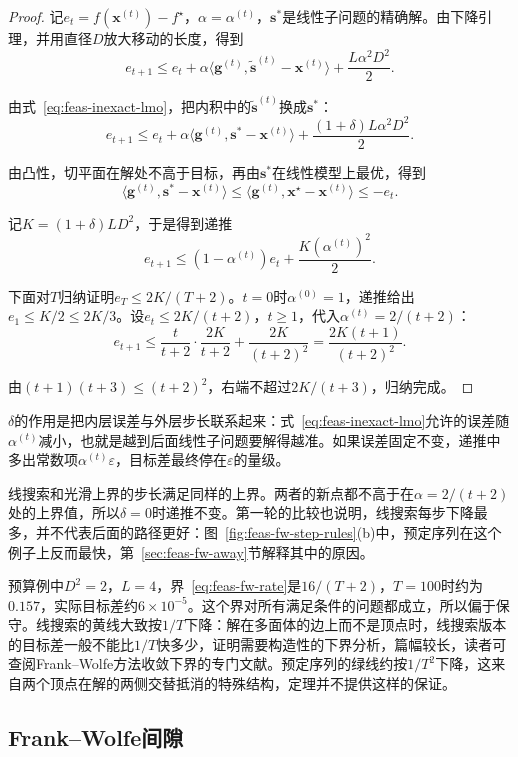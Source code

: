\begin{proof}
记$e_t=f(\bm{x}^{(t)})-f^\star$，$\alpha=\alpha^{(t)}$，$\bm{s}^\ast$是线性子问题的精确解。由下降引理，并用直径$D$放大移动的长度，得到
\[
 e_{t+1}\leq e_t+\alpha\langle\bm{g}^{(t)},\tilde{\bm{s}}^{(t)}-\bm{x}^{(t)}\rangle+\frac{L\alpha^2D^2}{2}.
\]

由式~\eqref{eq:feas-inexact-lmo}，把内积中的$\tilde{\bm{s}}^{(t)}$换成$\bm{s}^\ast$：
\[
 e_{t+1}\leq e_t+\alpha\langle\bm{g}^{(t)},\bm{s}^\ast-\bm{x}^{(t)}\rangle+\frac{(1+\delta)L\alpha^2D^2}{2}.
\]

由凸性，切平面在解处不高于目标，再由$\bm{s}^\ast$在线性模型上最优，得到
\[
 \langle\bm{g}^{(t)},\bm{s}^\ast-\bm{x}^{(t)}\rangle\leq\langle\bm{g}^{(t)},\bm{x}^\star-\bm{x}^{(t)}\rangle\leq-e_t.
\]

记$K=(1+\delta)LD^2$，于是得到递推
\[
 e_{t+1}\leq(1-\alpha^{(t)})e_t+\frac{K(\alpha^{(t)})^2}{2}.
\]

下面对$T$归纳证明$e_T\leq2K/(T+2)$。$t=0$时$\alpha^{(0)}=1$，递推给出$e_1\leq K/2\leq2K/3$。设$e_t\leq2K/(t+2)$，$t\geq1$，代入$\alpha^{(t)}=2/(t+2)$：
\[
 e_{t+1}\leq\frac{t}{t+2}\cdot\frac{2K}{t+2}+\frac{2K}{(t+2)^2}=\frac{2K(t+1)}{(t+2)^2}.
\]

由$(t+1)(t+3)\leq(t+2)^2$，右端不超过$2K/(t+3)$，归纳完成。
\end{proof}

$\delta$的作用是把内层误差与外层步长联系起来：式~\eqref{eq:feas-inexact-lmo}允许的误差随$\alpha^{(t)}$减小，也就是越到后面线性子问题要解得越准。如果误差固定不变，递推中多出常数项$\alpha^{(t)}\varepsilon$，目标差最终停在$\varepsilon$的量级。

线搜索和光滑上界的步长满足同样的上界。两者的新点都不高于在$\alpha=2/(t+2)$处的上界值，所以$\delta=0$时递推不变。第一轮的比较也说明，线搜索每步下降最多，并不代表后面的路径更好：图~\ref{fig:feas-fw-step-rules}(b)中，预定序列在这个例子上反而最快，第~\ref{sec:feas-fw-away}节解释其中的原因。

预算例中$D^2=2$，$L=4$，界~\eqref{eq:feas-fw-rate}是$16/(T+2)$，$T=100$时约为$0.157$，实际目标差约$6\times10^{-5}$。这个界对所有满足条件的问题都成立，所以偏于保守。线搜索的黄线大致按$1/T$下降：解在多面体的边上而不是顶点时，线搜索版本的目标差一般不能比$1/T$快多少，证明需要构造性的下界分析，篇幅较长，读者可查阅Frank--Wolfe方法收敛下界的专门文献。预定序列的绿线约按$1/T^2$下降，这来自两个顶点在解的两侧交替抵消的特殊结构，定理并不提供这样的保证。

\subsection{Frank--Wolfe间隙}
\label{sec:feas-fw-gap}

